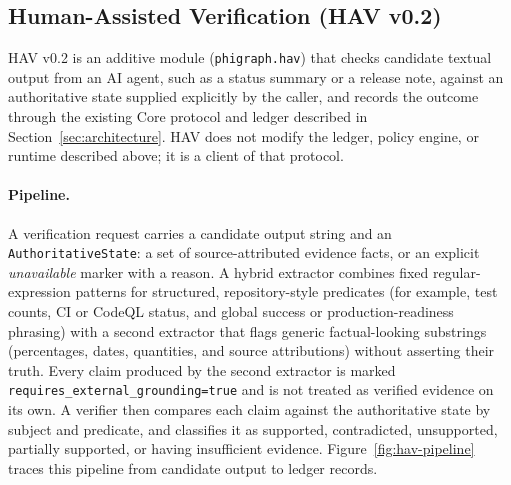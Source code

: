 \documentclass[11pt]{article}
\begin{document}
\subsection{Human-Assisted Verification (HAV v0.2)}
\label{sec:hav}

HAV v0.2 is an additive module (\texttt{phigraph.hav}) that checks candidate
textual output from an AI agent, such as a status summary or a release note,
against an authoritative state supplied explicitly by the caller, and records
the outcome through the existing Core protocol and ledger described in
Section~\ref{sec:architecture}. HAV does not modify the ledger, policy engine,
or runtime described above; it is a client of that protocol.

\paragraph{Pipeline.} A verification request carries a candidate output string
and an \texttt{AuthoritativeState}: a set of source-attributed evidence facts,
or an explicit \emph{unavailable} marker with a reason. A hybrid extractor
combines fixed regular-expression patterns for structured, repository-style
predicates (for example, test counts, CI or CodeQL status, and global
success or production-readiness phrasing) with a second extractor that
flags generic factual-looking substrings (percentages, dates, quantities,
and source attributions) without asserting their truth. Every claim produced
by the second extractor is marked \texttt{requires\_external\_grounding=true}
and is not treated as verified evidence on its own. A verifier then compares
each claim against the authoritative state by subject and predicate, and
classifies it as supported, contradicted, unsupported, partially supported, or
having insufficient evidence. Figure~\ref{fig:hav-pipeline} traces this
pipeline from candidate output to ledger records.
\end{document}
